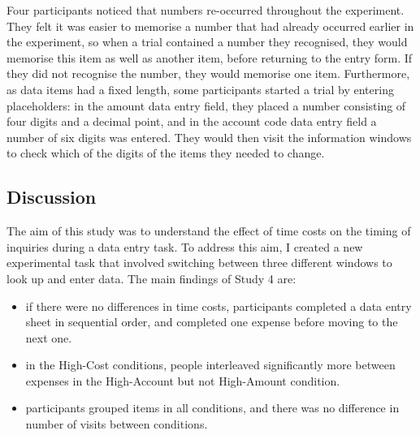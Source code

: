 Four participants noticed that numbers re-occurred throughout the experiment. They felt it was easier to memorise a number that had already occurred earlier in the experiment, so when a trial contained a number they recognised, they would memorise this item as well as another item, before returning to the entry form. If they did not recognise the number, they would memorise one item. Furthermore, as data items had a fixed length, some participants started a trial by entering placeholders: in the amount data entry field, they placed a number consisting of four digits and a decimal point, and in the account code data entry field a number of six digits was entered. They would then visit the information windows to check which of the digits of the items they needed to change. 

\subsection{Discussion}
The aim of this study was to understand the effect of time costs on the timing of inquiries during a data entry task. To address this aim, I created a new experimental task that involved switching between three different windows to look up and enter data. The main findings of Study 4 are:

\begin{itemize}
\item
if there were no differences in time costs, participants completed a data entry sheet in sequential order, and completed one expense before moving to the next one. 
\item
in the High-Cost conditions, people interleaved significantly more between expenses in the High-Account but not High-Amount condition. 
\item
participants grouped items in all conditions, and there was no difference in number of visits between conditions.
\end{itemize}

